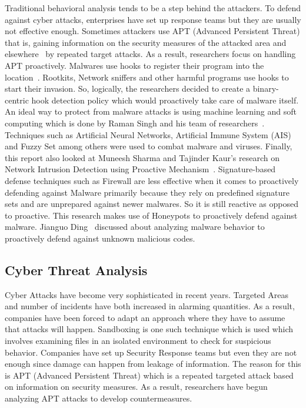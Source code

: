 \documentclass[11pt]{article}
\begin{document}
	Traditional behavioral analysis tends to be a step behind the attackers. To defend against cyber attacks, enterprises have set up response teams but they are usually not effective enough. Sometimes attackers use APT (Advanced Persistent Threat) that is, gaining information on the security measures of the attacked area and elsewhere~\cite{cyberthreatanalysis} by repeated target attacks. As a result, researchers focus on handling APT proactively. Malwares use hooks to register their program into the location~\cite{hookscout}. Rootkits, Network sniffers and other harmful programs use hooks to start their invasion. So, logically, the researchers decided to create a binary-centric hook detection policy which would proactively take care of malware itself. An ideal way to protect from malware attacks is using machine learning and soft computing which is done by Raman Singh and his team of researchers~\cite{softcomputingproactive}. Techniques such as Artificial Neural Networks, Artificial Immune System (AIS) and Fuzzy Set among others were used to combat malware and viruses.  Finally, this report also looked at Muneesh Sharma and Tajinder Kaur’s research on Network Intrusion Detection using Proactive Mechanism~\cite{nidsproactive}. Signature-based defense techniques such as Firewall are less effective when it comes to proactively defending against Malware primarily because they rely on predefined signature sets and are unprepared against newer malwares. So it is still reactive as opposed to proactive. This research makes use of Honeypots to proactively defend against malware. Jianguo Ding~\cite{behaviorbasedproactive} discussed about analyzing malware behavior to proactively defend against unknown malicious codes. \\
	
	\subsection{Cyber Threat Analysis}
	
	Cyber Attacks have become very sophisticated in recent years. Targeted Areas and number of incidents have both increased in alarming quantities. As a result, companies have been forced to adapt an approach where they have to assume that attacks will happen. Sandboxing is one such technique which is used which involves examining files in an isolated environment to check for suspicious behavior. Companies have set up Security Response teams but even they are not enough since damage can happen from leakage of information. The reason for this is APT (Advanced Persistent Threat) which is a repeated targeted attack based on information on security measures. As a result, researchers have begun analyzing APT attacks to develop countermeasures. 
	
\end{document}
